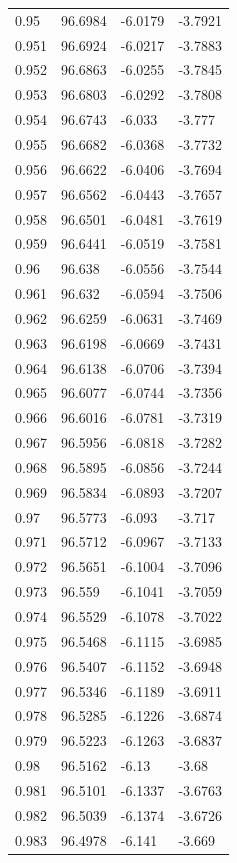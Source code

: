 \begin{tabular}{llll}
0.95 & 96.6984 & -6.0179 & -3.7921 \\
0.951 & 96.6924 & -6.0217 & -3.7883 \\
0.952 & 96.6863 & -6.0255 & -3.7845 \\
0.953 & 96.6803 & -6.0292 & -3.7808 \\
0.954 & 96.6743 & -6.033 & -3.777 \\
0.955 & 96.6682 & -6.0368 & -3.7732 \\
0.956 & 96.6622 & -6.0406 & -3.7694 \\
0.957 & 96.6562 & -6.0443 & -3.7657 \\
0.958 & 96.6501 & -6.0481 & -3.7619 \\
0.959 & 96.6441 & -6.0519 & -3.7581 \\
0.96 & 96.638 & -6.0556 & -3.7544 \\
0.961 & 96.632 & -6.0594 & -3.7506 \\
0.962 & 96.6259 & -6.0631 & -3.7469 \\
0.963 & 96.6198 & -6.0669 & -3.7431 \\
0.964 & 96.6138 & -6.0706 & -3.7394 \\
0.965 & 96.6077 & -6.0744 & -3.7356 \\
0.966 & 96.6016 & -6.0781 & -3.7319 \\
0.967 & 96.5956 & -6.0818 & -3.7282 \\
0.968 & 96.5895 & -6.0856 & -3.7244 \\
0.969 & 96.5834 & -6.0893 & -3.7207 \\
0.97 & 96.5773 & -6.093 & -3.717 \\
0.971 & 96.5712 & -6.0967 & -3.7133 \\
0.972 & 96.5651 & -6.1004 & -3.7096 \\
0.973 & 96.559 & -6.1041 & -3.7059 \\
0.974 & 96.5529 & -6.1078 & -3.7022 \\
0.975 & 96.5468 & -6.1115 & -3.6985 \\
0.976 & 96.5407 & -6.1152 & -3.6948 \\
0.977 & 96.5346 & -6.1189 & -3.6911 \\
0.978 & 96.5285 & -6.1226 & -3.6874 \\
0.979 & 96.5223 & -6.1263 & -3.6837 \\
0.98 & 96.5162 & -6.13 & -3.68 \\
0.981 & 96.5101 & -6.1337 & -3.6763 \\
0.982 & 96.5039 & -6.1374 & -3.6726 \\
0.983 & 96.4978 & -6.141 & -3.669 \\

\end{tabular}
